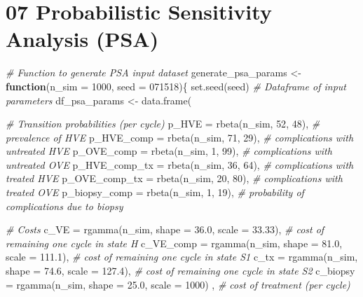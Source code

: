 \documentclass[
]{article}
\newenvironment{Shaded}{\begin{snugshade}}{\end{snugshade}}
\newcommand{\AttributeTok}[1]{\textcolor[rgb]{0.77,0.63,0.00}{#1}}
\newcommand{\CommentTok}[1]{\textcolor[rgb]{0.56,0.35,0.01}{\textit{#1}}}
\newcommand{\ControlFlowTok}[1]{\textcolor[rgb]{0.13,0.29,0.53}{\textbf{#1}}}
\newcommand{\DecValTok}[1]{\textcolor[rgb]{0.00,0.00,0.81}{#1}}
\newcommand{\FloatTok}[1]{\textcolor[rgb]{0.00,0.00,0.81}{#1}}
\newcommand{\FunctionTok}[1]{\textcolor[rgb]{0.00,0.00,0.00}{#1}}
\newcommand{\NormalTok}[1]{#1}
\newcommand{\OtherTok}[1]{\textcolor[rgb]{0.56,0.35,0.01}{#1}}
\begin{document}
\hypertarget{probabilistic-sensitivity-analysis-psa}{%
\section{07 Probabilistic Sensitivity Analysis
(PSA)}\label{probabilistic-sensitivity-analysis-psa}}

\begin{Shaded}
\begin{Highlighting}[]
\CommentTok{\# Function to generate PSA input dataset}
\NormalTok{generate\_psa\_params }\OtherTok{\textless{}{-}} \ControlFlowTok{function}\NormalTok{(}\AttributeTok{n\_sim =} \DecValTok{1000}\NormalTok{, }\AttributeTok{seed =} \DecValTok{071518}\NormalTok{)\{}
  \FunctionTok{set.seed}\NormalTok{(seed)}
  \CommentTok{\# Dataframe of input parameters}
\NormalTok{  df\_psa\_params   }\OtherTok{\textless{}{-}} \FunctionTok{data.frame}\NormalTok{(}
    
    \CommentTok{\# Transition probabilities (per cycle)}
    \AttributeTok{p\_HVE         =} \FunctionTok{rbeta}\NormalTok{(n\_sim, }\DecValTok{52}\NormalTok{, }\DecValTok{48}\NormalTok{), }\CommentTok{\# prevalence of HVE}
    \AttributeTok{p\_HVE\_comp    =} \FunctionTok{rbeta}\NormalTok{(n\_sim, }\DecValTok{71}\NormalTok{, }\DecValTok{29}\NormalTok{), }\CommentTok{\# complications with untreated HVE}
    \AttributeTok{p\_OVE\_comp    =} \FunctionTok{rbeta}\NormalTok{(n\_sim,  }\DecValTok{1}\NormalTok{, }\DecValTok{99}\NormalTok{), }\CommentTok{\# complications with untreated OVE}
    \AttributeTok{p\_HVE\_comp\_tx =} \FunctionTok{rbeta}\NormalTok{(n\_sim, }\DecValTok{36}\NormalTok{, }\DecValTok{64}\NormalTok{), }\CommentTok{\# complications with treated HVE}
    \AttributeTok{p\_OVE\_comp\_tx =} \FunctionTok{rbeta}\NormalTok{(n\_sim, }\DecValTok{20}\NormalTok{, }\DecValTok{80}\NormalTok{), }\CommentTok{\# complications with treated OVE}
    \AttributeTok{p\_biopsy\_comp =} \FunctionTok{rbeta}\NormalTok{(n\_sim,  }\DecValTok{1}\NormalTok{, }\DecValTok{19}\NormalTok{), }\CommentTok{\# probability of complications due to biopsy}
    
    \CommentTok{\# Costs}
    \AttributeTok{c\_VE      =} \FunctionTok{rgamma}\NormalTok{(n\_sim, }\AttributeTok{shape =} \FloatTok{36.0}\NormalTok{, }\AttributeTok{scale =} \FloatTok{33.33}\NormalTok{), }\CommentTok{\# cost of remaining one cycle in state H}
    \AttributeTok{c\_VE\_comp =} \FunctionTok{rgamma}\NormalTok{(n\_sim, }\AttributeTok{shape =} \FloatTok{81.0}\NormalTok{, }\AttributeTok{scale =} \FloatTok{111.1}\NormalTok{), }\CommentTok{\# cost of remaining one cycle in state S1}
    \AttributeTok{c\_tx      =} \FunctionTok{rgamma}\NormalTok{(n\_sim, }\AttributeTok{shape =} \FloatTok{74.6}\NormalTok{, }\AttributeTok{scale =} \FloatTok{127.4}\NormalTok{), }\CommentTok{\# cost of remaining one cycle in state S2}
    \AttributeTok{c\_biopsy  =} \FunctionTok{rgamma}\NormalTok{(n\_sim, }\AttributeTok{shape =} \FloatTok{25.0}\NormalTok{, }\AttributeTok{scale =} \DecValTok{1000}\NormalTok{) , }\CommentTok{\# cost of treatment (per cycle)}
    

\end{Highlighting}
\end{Shaded}
\end{document}
